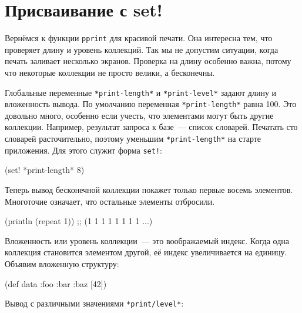 \section{Присваивание с set!}


Вернёмся к функции \verb|pprint| для красивой печати. Она интересна тем, что
проверяет длину и уровень коллекций. Так мы не допустим ситуации, когда печать
заливает несколько экранов. Проверка на длину особенно важна, потому что
некоторые коллекции не просто велики, а бесконечны.


Глобальные переменные \verb|*print-length*| и \verb|*print-level*| задают длину
и вложенность вывода. По умолчанию переменная \verb|*print-length*| равна 100. Это довольно
много, особенно если учесть, что элементами могут быть другие
коллекции. Например, результат запроса к базе~--- список словарей. Печатать сто
словарей расточительно, поэтому уменьшим \verb|*print-length*| на старте
приложения. Для этого служит форма \verb|set!|:

\begin{english}
  \begin{clojure}
(set! *print-length* 8)
  \end{clojure}
\end{english}

Теперь вывод бесконечной коллекции покажет только первые восемь
элементов. Многоточие означает, что остальные элементы отбросили.

\begin{english}
  \begin{clojure}
(println (repeat 1))
;; (1 1 1 1 1 1 1 1 ...)
  \end{clojure}
\end{english}

Вложенность или уровень коллекции~--- это воображаемый индекс. Когда одна коллекция
становится элементом другой, её индекс увеличивается на единицу. Объявим
вложенную структуру:

\begin{english}
  \begin{clojure}
(def data {:foo
            {:bar
              {:baz [42]}}})
  \end{clojure}
\end{english}

\noindentnarrow
Вывод с различными значениями \texttt{*print\-/level*}:


